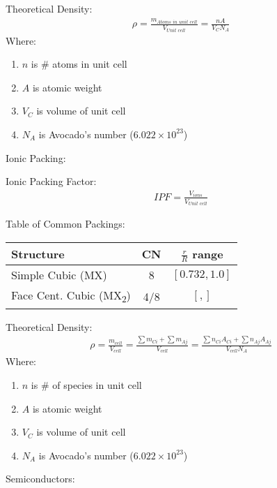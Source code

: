 \documentclass{article}
\begin{document}
\begin{multicols}{2}
Theoretical Density:
\begin{equation*}
    \begin{split}
        \rho = \frac{m_\textit{Atoms in unit cell}}{V_\textit{Unit cell}} = \frac{n A}{V_C N_A}
    \end{split}
\end{equation*}
Where:
\begin{enumerate}
    \setlength\itemsep{-0.5em}
    \item $n$ is \# atoms in unit cell
    \item $A$ is atomic weight
    \item $V_C$ is volume of unit cell
    \item $N_A$ is Avocado's number ($6.022 \times 10^{23}$)
\end{enumerate}
Ionic Packing:

Ionic Packing Factor:
\begin{equation*}
    \begin{split}
        \textit{IPF} = \frac{V_\textit{ions}}{V_\textit{Unit cell}} 
    \end{split}
\end{equation*}

Table of Common Packings:
\begin{center}
    \begin{tabular}{ l c c }
        Structure                    & CN  & $\frac{r}{R}$ range \\
        \hline
        Simple Cubic (MX)            & 8   & $[0.732, 1.0]$ \\ 
        Face Cent. Cubic 
        (MX\textsubscript{2})        & 4/8 & $[, ]$ \\  
    \end{tabular}
\end{center}

Theoretical Density:
\begin{equation*}
    \begin{split}
        \rho 
        = \frac{m_\textit{cell}}{V_\textit{cell}} 
        = \frac{\sum m_{Ci} + \sum m_{Aj}}{V_{cell}}
        = \frac{\sum n_{Ci}A_{Ci} + \sum n_{Aj}A_{Aj}}{V_{cell} N_A}
    \end{split}
\end{equation*}
Where:
\begin{enumerate}
    \setlength\itemsep{-0.5em}
    \item $n$ is \# of species in unit cell
    \item $A$ is atomic weight
    \item $V_C$ is volume of unit cell
    \item $N_A$ is Avocado's number ($6.022 \times 10^{23}$)
\end{enumerate}
Semiconductors:


\end{multicols}
\end{document}
